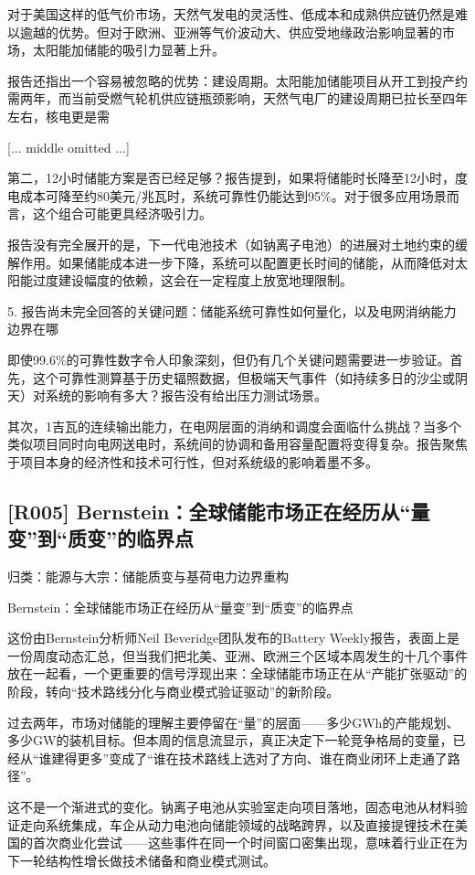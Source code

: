 \documentclass[11pt]{ctexart}
\begin{document}
对于美国这样的低气价市场，天然气发电的灵活性、低成本和成熟供应链仍然是难以逾越的优势。但对于欧洲、亚洲等气价波动大、供应受地缘政治影响显著的市场，太阳能加储能的吸引力显著上升。

报告还指出一个容易被忽略的优势：建设周期。太阳能加储能项目从开工到投产约需两年，而当前受燃气轮机供应链瓶颈影响，天然气电厂的建设周期已拉长至四年左右，核电更是需

[... middle omitted ...]

第二，12小时储能方案是否已经足够？报告提到，如果将储能时长降至12小时，度电成本可降至约80美元/兆瓦时，系统可靠性仍能达到95\%。对于很多应用场景而言，这个组合可能更具经济吸引力。

报告没有完全展开的是，下一代电池技术（如钠离子电池）的进展对土地约束的缓解作用。如果储能成本进一步下降，系统可以配置更长时间的储能，从而降低对太阳能过度建设幅度的依赖，这会在一定程度上放宽地理限制。

5. 报告尚未完全回答的关键问题：储能系统可靠性如何量化，以及电网消纳能力边界在哪

即使99.6\%的可靠性数字令人印象深刻，但仍有几个关键问题需要进一步验证。首先，这个可靠性测算基于历史辐照数据，但极端天气事件（如持续多日的沙尘或阴天）对系统的影响有多大？报告没有给出压力测试场景。

其次，1吉瓦的连续输出能力，在电网层面的消纳和调度会面临什么挑战？当多个类似项目同时向电网送电时，系统间的协调和备用容量配置将变得复杂。报告聚焦于项目本身的经济性和技术可行性，但对系统级的影响着墨不多。

\subsection{[R005] Bernstein：全球储能市场正在经历从“量变”到“质变”的临界点}
{\small\color{refgray}归类：能源与大宗：储能质变与基荷电力边界重构}

Bernstein：全球储能市场正在经历从“量变”到“质变”的临界点

这份由Bernstein分析师Neil Beveridge团队发布的Battery Weekly报告，表面上是一份周度动态汇总，但当我们把北美、亚洲、欧洲三个区域本周发生的十几个事件放在一起看，一个更重要的信号浮现出来：全球储能市场正在从“产能扩张驱动”的阶段，转向“技术路线分化与商业模式验证驱动”的新阶段。

过去两年，市场对储能的理解主要停留在“量”的层面——多少GWh的产能规划、多少GW的装机目标。但本周的信息流显示，真正决定下一轮竞争格局的变量，已经从“谁建得更多”变成了“谁在技术路线上选对了方向、谁在商业闭环上走通了路径”。

这不是一个渐进式的变化。钠离子电池从实验室走向项目落地，固态电池从材料验证走向系统集成，车企从动力电池向储能领域的战略跨界，以及直接提锂技术在美国的首次商业化尝试——这些事件在同一个时间窗口密集出现，意味着行业正在为下一轮结构性增长做技术储备和商业模式测试。
\end{document}
